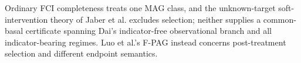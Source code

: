 Ordinary FCI completeness treats one MAG class, and the unknown-target soft-intervention theory of Jaber et al. excludes selection; neither supplies a common-basal certificate spanning Dai's indicator-free observational branch and all indicator-bearing regimes.  Luo et al.'s F-PAG instead concerns post-treatment selection and different endpoint semantics.
